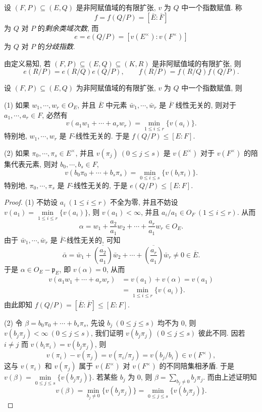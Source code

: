 \begin{definition}\label{def:ch7-6}
设 $(F,P)\subseteq(E,Q)$ 是非阿赋值域的有限扩张, $v$ 为 $Q$ 中一个指数赋值. 称
\[
  f=f(Q/P)=[\overline{E}:\overline{F}]
\]
为 $Q$ 对 $P$ 的\emph{剩余类域次数}, 而
\[
  e=e(Q/P)=[v(E^{\times}):v(F^{\times})]
\]
为 $Q$ 对 $P$ 的\emph{分歧指数}.
\end{definition}

由定义易知, 若 $(F,P)\subseteq(E,Q)\subseteq(K,R)$ 是非阿赋值域的有限扩张, 则
\[
  e(R/P)=e(R/Q)e(Q/P),\qquad f(R/P)=f(R/Q)f(Q/P).
\]

\begin{lemma}\label{lem:ch7-9}
设 $(F,P)\subseteq(E,Q)$ 为非阿赋值域的有限扩张, $v$ 为 $Q$ 中一个指数赋值, 则

(1) 如果 $w_1,\cdots,w_r\in O_E$, 并且 $\overline{E}$ 中元素 $\bar{w}_1,\cdots,\bar{w}_r$ 是 $\overline{F}$ 线性无关的, 则对于 $a_1,\cdots,a_r\in F$, 必然有
\[
  v(a_1w_1+\cdots+a_rw_r)=\min_{1\leqslant i\leqslant r}\{v(a_i)\}.
\]
特别地, $w_1,\cdots,w_r$ 是 $F$-线性无关的. 于是 $f(Q/P)\leqslant[E:F]$.

(2) 如果 $\pi_0,\cdots,\pi_s\in E^{\times}$, 并且 $v(\pi_j)\ (0\leqslant j\leqslant s)$ 是 $v(E^{\times})$ 对于 $v(F^{\times})$ 的陪集代表元素, 则对 $b_0,\cdots,b_s\in F$,
\[
  v(b_0\pi_0+\cdots+b_s\pi_s)=\min_{0\leqslant i\leqslant s}\{v(b_i\pi_i)\}.
\]
特别地, $\pi_0,\cdots,\pi_s$ 是 $F$-线性无关的, 于是 $e(Q/P)\leqslant[E:F]$.
\end{lemma}

\begin{proof}
(1) 不妨设 $a_i\ (1\leqslant i\leqslant r)$ 不全为零, 并且不妨设 $v(a_1)=\min\limits_{1\leqslant i\leqslant r}\{v(a_i)\}$, 则 $v(a_1)<\infty$, 并且 $a_i/a_1\in O_F\ (1\leqslant i\leqslant r)$. 从而
\[
  \alpha=w_1+\frac{a_2}{a_1}w_2+\cdots+\frac{a_r}{a_1}w_r\in O_E.
\]
由于 $\bar{w}_1,\cdots,\bar{w}_r$ 是 $\overline{F}$-线性无关的, 可知
\[
  \bar{\alpha}=\bar{w}_1+\overline{\left(\frac{a_2}{a_1}\right)}\bar{w}_2+\cdots+\overline{\left(\frac{a_r}{a_1}\right)}\bar{w}_r\neq 0\in\overline{E}.
\]
于是 $\alpha\in O_E-\mathfrak{p}_E$, 即 $v(\alpha)=0$, 从而
\begin{align*}
  v(a_1w_1+\cdots+a_rw_r)&=v(a_1)+v(\alpha)=v(a_1)\\
  &=\min_{1\leqslant i\leqslant r}\{v(a_i)\}.
\end{align*}
由此即知 $f(Q/P)=[\overline{E}:\overline{F}]\leqslant[E:F]$.

(2) 令 $\beta=b_0\pi_0+\cdots+b_s\pi_s$, 先设 $b_j\ (0\leqslant j\leqslant s)$ 均不为 $0$, 则 $v(b_j\pi_j)<\infty\ (0\leqslant j\leqslant s)$, 我们证明 $v(b_j\pi_j)\ (0\leqslant j\leqslant s)$ 彼此不同. 因若 $i\neq j$ 而 $v(b_i\pi_i)=v(b_j\pi_j)$, 则
\[
  v(\pi_i)-v(\pi_j)=v(\pi_i/\pi_j)=v(b_j/b_i)\in v(F^{\times}),
\]
这与 $v(\pi_i)$ 和 $v(\pi_j)$ 属于 $v(E^{\times})$ 对 $v(F^{\times})$ 的不同陪集相矛盾. 于是 $v(\beta)=\min\limits_{0\leqslant j\leqslant s}\{v(b_j\pi_j)\}$. 若某些 $b_j$ 为 $0$, 则 $\beta=\sum_{b_j\neq 0}b_j\pi_j$. 而由上述证明知
\[
  v(\beta)=\min_{b_j\neq 0}\{v(b_j\pi_j)\}=\min_{0\leqslant j\leqslant s}\{v(b_j\pi_j)\}.
\]
\end{proof}

